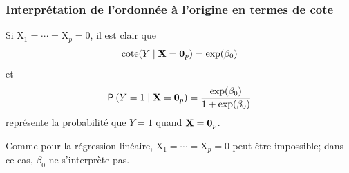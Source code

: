 \documentclass{beamer}
\begin{document}
\begin{frame}[fragile]
\frametitle{Interprétation de l'ordonnée à l'origine en termes de cote}
\bi
\item Si $\mathrm{X}_1=\cdots = \mathrm{X}_p=0$, il est clair que
\begin{align*}
\mathrm{cote}(Y\mid \mathbf{X}=\boldsymbol {0}_p) = \exp(\beta_0)
\end{align*}
et
\begin{align*}
{\mathsf P}_{}\left(Y=1\mid  \mathbf{X}=\boldsymbol {0}_p\right) = \frac{\exp({\beta_0})}{1+\exp({\beta_0})}
\end{align*}
représente la probabilité que $Y=1$ quand $\mathbf{X}=\boldsymbol {0}_p$.
\item Comme pour la régression linéaire, $\mathrm{X}_1=\cdots =\mathrm{X}_p=0$ peut être impossible; dans ce cas, $\beta_0$ ne s'interprète pas.
\ei
\end{frame}
\end{document}
